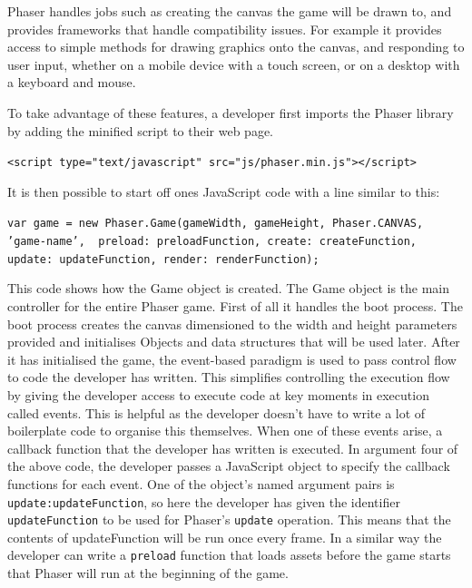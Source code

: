 \documentclass[12pt,a4paper,twoside,openright]{report}
\begin{document}
Phaser handles jobs such as creating the canvas the game will be drawn to, and provides frameworks that handle compatibility issues. For example it provides access to simple methods for drawing graphics onto the canvas, and responding to user input, whether on a mobile device with a touch screen, or on a desktop with a keyboard and mouse.

To take advantage of these features, a developer first imports the Phaser library by adding the minified script to their web page. %


\begin{displayquote}
	\texttt{<script type="text/javascript" src="js/phaser.min.js"></script>}
\end{displayquote}

It is then possible to start off ones JavaScript code with a line similar to this:

\begin{displayquote}
	\texttt{var game = new Phaser.Game(gameWidth, gameHeight, Phaser.CANVAS, 'game-name', { preload: preloadFunction, create: createFunction, update: updateFunction, render: renderFunction});}
\end{displayquote}

This code shows how the Game object is created.
The Game object is the main controller for the entire Phaser game. 
First of all it handles the boot process. The boot process creates the canvas dimensioned to the width and height parameters provided and initialises Objects and data structures that will be used later.
After it has initialised the game, the event-based paradigm is used to pass control flow to code the developer has written. 
This simplifies controlling the execution flow
by giving the developer access to execute code at key moments in execution called events.
This is helpful as the developer doesn't have to write a lot of boilerplate code to organise this themselves.
When one of these events arise, a callback function that the developer has written is executed. In argument four of the above code, the developer passes a JavaScript object to specify the callback functions for each event.
One of the object's named argument pairs is \texttt{update:updateFunction}, so here the developer has given the identifier \texttt{updateFunction} to be used for Phaser's \texttt{update} operation. This means that the contents of updateFunction will be run once every frame.
In a similar way the developer can write a \texttt{preload} function that loads assets before the game starts that Phaser will run at the beginning of the game.
\end{document}
